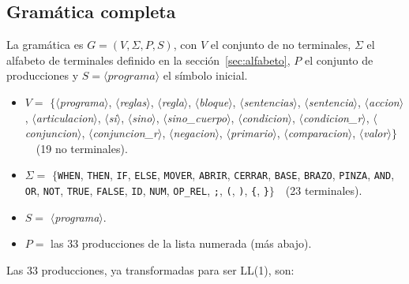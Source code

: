 \documentclass[10pt,a4paper]{article}
\newcommand{\nt}[1]{\ensuremath{\langle}\textit{#1}\ensuremath{\rangle}}   %
\newcommand{\tm}[1]{\texttt{#1}}                                          %
\begin{document}
\subsection{Gramática completa}
\label{sec:gramatica_completa}

La gramática es $G = (V, \Sigma, P, S)$, con $V$ el conjunto de no terminales, $\Sigma$ el alfabeto
de terminales definido en la sección~\ref{sec:alfabeto}, $P$ el conjunto de producciones y
$S = \nt{programa}$ el símbolo inicial.

\begin{itemize}[nosep]
\item $V = $ \ensuremath{\{}\nt{programa}, \nt{reglas}, \nt{regla}, \nt{bloque}, \nt{sentencias}, \nt{sentencia}, \nt{accion}, \nt{articulacion}, \nt{si}, \nt{sino}, \nt{sino\_cuerpo}, \nt{condicion}, \nt{condicion\_r}, \nt{conjuncion}, \nt{conjuncion\_r}, \nt{negacion}, \nt{primario}, \nt{comparacion}, \nt{valor}\ensuremath{\}}\ \ (19 no terminales).
\item $\Sigma = $ \ensuremath{\{}\tm{WHEN}, \tm{THEN}, \tm{IF}, \tm{ELSE}, \tm{MOVER}, \tm{ABRIR}, \tm{CERRAR}, \tm{BASE}, \tm{BRAZO}, \tm{PINZA}, \tm{AND}, \tm{OR}, \tm{NOT}, \tm{TRUE}, \tm{FALSE}, \tm{ID}, \tm{NUM}, \tm{OP\_REL}, \tm{;}, \tm{(}, \tm{)}, \tm{\{}, \tm{\}}\ensuremath{\}}\ \ (23 terminales).
\item $S = $ \nt{programa}.
\item $P = $ las 33 producciones de la lista numerada (más abajo).\end{itemize}

Las 33 producciones, ya transformadas para ser LL(1), son:
\end{document}
